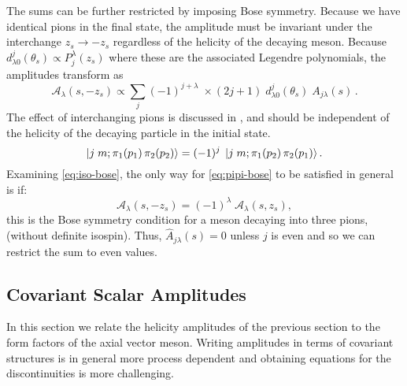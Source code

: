 \documentclass[10pt, aps,prd,amsmath,amssymb,superscriptaddress,onecolumn,
nofootinbib,showpacs,preprintnumbers]{revtex4-1}
\begin{document}
The sums can be further restricted by imposing Bose symmetry. Because we have identical pions in the final state, the amplitude must be invariant under the interchange \(z_s \to -z_s\) regardless of the helicity of the decaying meson.
Because \(d^j_{\lambda0}(\theta_s) \propto P^\lambda_j(z_s)\) where these are the associated Legendre polynomials, the amplitudes transform as
  \begin{equation}
    \label{eq:iso-bose}
   \mathcal{A}_\lambda(s, -z_s) \propto \sum_{j} (-1)^{j+\lambda} \; \times (2j+1) \;  d^j_{\lambda0}(\theta_s) \; A_{j\lambda}(s) \,.
  \end{equation}
The effect of interchanging pions is discussed in \cite{JACOB1959404}, and should be independent of the helicity of the decaying particle in the initial state.
  \begin{equation}
    \label{eq:pipi-bose}
    \ket{j \; m ; \pi_1(p_1) \, \pi_2(p_2)} = (-1)^j \; \ket{j \; m; \pi_1(p_2) \, \pi_2(p_1)}.
  \end{equation}
Examining \cref{eq:iso-bose}, the only way for \cref{eq:pipi-bose} to be satisfied in general is if:
  \begin{equation}
    \label{eq:helicity-bose}
    \mathcal{A}_\lambda(s,-z_s) = (-1)^\lambda \; \mathcal{A}_\lambda(s, z_s),
  \end{equation}
this is the Bose symmetry condition for a meson decaying into three pions, (without definite isospin).
Thus, \(\hat{A}_{j\lambda}(s) = 0\) unless \(j\) is even and so we can restrict the sum to even values.
 \subsection{Covariant Scalar Amplitudes}
 In this section we relate the helicity amplitudes of the previous section to the form factors of the axial vector meson. Writing amplitudes in terms of covariant structures is in general more process dependent and obtaining equations for the discontinuities is more challenging.
\end{document}
